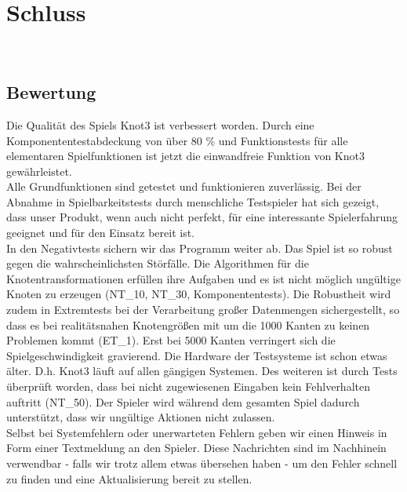 %



\chapter{Schluss}
\label{Kapitel:Abschluss}

~\\



\section{Bewertung}
\label{Abschnitt:Abschluss:Bewertung}

Die Qualität des Spiels Knot3 ist verbessert worden. Durch eine Komponententestabdeckung von über 80 \% und Funktionstests für alle elementaren Spielfunktionen ist jetzt die einwandfreie Funktion von Knot3 gewährleistet.\\

Alle Grundfunktionen sind getestet und funktionieren zuverlässig. Bei der Abnahme in Spielbarkeitstests durch menschliche Testspieler hat sich gezeigt, dass unser Produkt, wenn auch nicht perfekt, für eine interessante Spielerfahrung geeignet und für den Einsatz bereit ist.\\

In den Negativtests sichern wir das Programm weiter ab. Das Spiel ist so robust gegen die wahrscheinlichsten Störfälle. Die Algorithmen für die Knotentransformationen erfüllen ihre Aufgaben und es ist nicht möglich ungültige Knoten zu erzeugen (NT\_10, NT\_30, Komponententests). Die Robustheit wird zudem in Extremtests bei der Verarbeitung großer Datenmengen sichergestellt, so dass es bei realitätsnahen Knotengrößen mit um die 1000 Kanten zu keinen Problemen kommt (ET\_1). Erst bei 5000 Kanten verringert sich die Spielgeschwindigkeit gravierend. Die Hardware der Testsysteme ist schon etwas älter. D.h. Knot3 läuft auf allen gängigen Systemen. Des weiteren ist durch Tests überprüft worden, dass bei nicht zugewiesenen Eingaben kein Fehlverhalten auftritt (NT\_50). Der Spieler wird während dem gesamten Spiel dadurch unterstützt, dass wir ungültige Aktionen nicht zulassen.\\

Selbst bei Systemfehlern oder unerwarteten Fehlern geben wir einen Hinweis in Form einer Textmeldung an den Spieler. Diese Nachrichten sind im Nachhinein verwendbar - falls wir trotz allem etwas übersehen haben - um den Fehler schnell zu finden und eine Aktualisierung bereit zu stellen.\\

